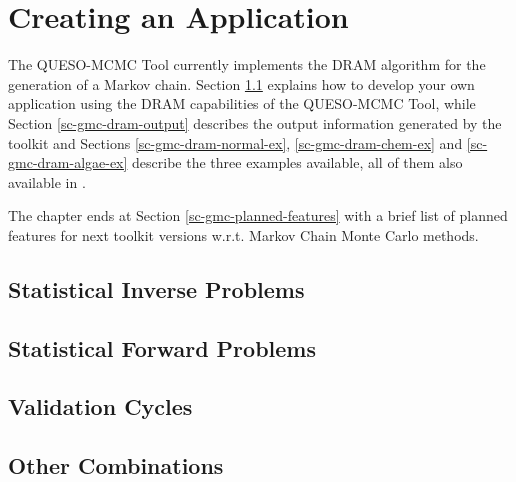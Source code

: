 \chapter{Creating an Application}\label{ch-gmc}
\thispagestyle{headings}

The QUESO-MCMC Tool currently implements the DRAM algorithm \cite{HaLaMiSa06} for the generation of a Markov chain.
Section \ref{sc-gmc-eight-steps} explains how to develop your own application using the DRAM capabilities of the QUESO-MCMC Tool, while
Section \ref{sc-gmc-dram-output} describes the output information generated by the toolkit and
Sections
\ref{sc-gmc-dram-normal-ex},
\ref{sc-gmc-dram-chem-ex} and
\ref{sc-gmc-dram-algae-ex}
describe the three examples available,
all of them also available in \cite{mcmctool}.

The chapter ends at Section \ref{sc-gmc-planned-features} with a brief list of planned features for next toolkit versions w.r.t. Markov Chain Monte Carlo methods.

\section{Statistical Inverse Problems}\label{sc-gmc-eight-steps}

\section{Statistical Forward Problems}

\section{Validation Cycles}

\section{Other Combinations}

